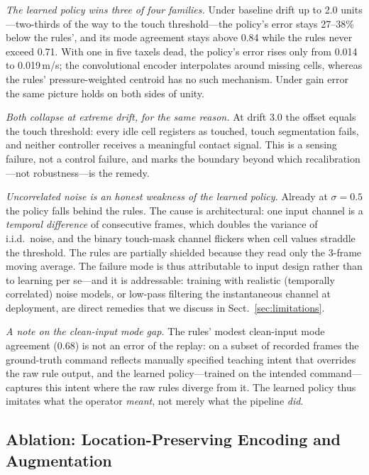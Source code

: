 \documentclass[runningheads]{llncs}
\begin{document}
\emph{The learned policy wins three of four families.}
Under baseline drift up to 2.0 units---two-thirds of the way to the touch
threshold---the policy's error stays 27--38\% below the rules', and its
mode agreement stays above 0.84 while the rules never exceed 0.71.  With
one in five taxels dead, the policy's error rises only from 0.014 to
0.019\,m/s; the convolutional encoder interpolates around missing cells,
whereas the rules' pressure-weighted centroid has no such mechanism.
Under gain error the same picture holds on both sides of unity.

\emph{Both collapse at extreme drift, for the same reason.}
At drift 3.0 the offset equals the touch threshold: every idle cell
registers as touched, touch segmentation fails, and neither controller
receives a meaningful contact signal.  This is a sensing failure, not a
control failure, and marks the boundary beyond which recalibration---not
robustness---is the remedy.

\emph{Uncorrelated noise is an honest weakness of the learned policy.}
Already at $\sigma{=}0.5$ the policy falls behind the rules.  The cause is
architectural: one input channel is a \emph{temporal difference} of
consecutive frames, which doubles the variance of i.i.d.\ noise, and the
binary touch-mask channel flickers when cell values straddle the
threshold.  The rules are partially shielded because they read only the
3-frame moving average.  The failure mode is thus attributable to input
design rather than to learning per se---and it is addressable: training
with realistic (temporally correlated) noise models, or low-pass filtering
the instantaneous channel at deployment, are direct remedies that we
discuss in Sect.~\ref{sec:limitations}.

\emph{A note on the clean-input mode gap.}
The rules' modest clean-input mode agreement (0.68) is not an error of the
replay: on a subset of recorded frames the ground-truth command reflects
manually specified teaching intent that overrides the raw rule output, and
the learned policy---trained on the intended command---captures this
intent where the raw rules diverge from it.  The learned policy thus
imitates what the operator \emph{meant}, not merely what the pipeline
\emph{did}.

\subsection{Ablation: Location-Preserving Encoding and Augmentation}
\end{document}
